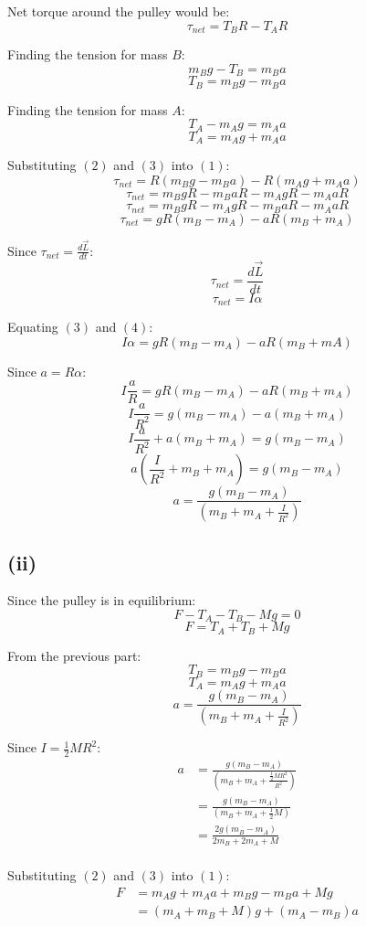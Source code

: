 \documentclass[11pt]{article}
\begin{document}
Net torque around the pulley would be:
\[\tau_{net} = T_B R - T_A R \tag{1}\]

Finding the tension for mass \(B\):
\[m_B g - T_B = m_B a\]
\[T_B = m_B g - m_B a \tag{2}\]

Finding the tension for mass \(A\):
\[T_A - m_A g = m_A a\]
\[T_A = m_A g + m_A a \tag{3}\]

Substituting \((2)\) and \((3)\) into \((1)\):
\[\tau_{net} = R(m_B g - m_B a) - R(m_A g + m_A a) \]
\[\tau_{net} = m_B gR - m_B aR - m_A gR - m_A aR \]
\[\tau_{net} = m_B gR - m_A gR - m_B aR - m_A aR \]
\[\tau_{net} = gR(m_B - m_A) - aR(m_B + m_A) \]

Since \(\tau_{net} = \frac{d \vec{L}}{dt}\):
\[\tau_{net} = \frac{d \vec{L}}{dt}\]
\[\tau_{net} = I \alpha \tag{4}\]

Equating \((3)\) and \((4)\):
\[I \alpha = gR(m_B - m_A) - aR(m_B + mA)\]

\newpage

Since \(a = R \alpha\):
\[I \frac{a}{R} = gR(m_B - m_A) - aR(m_B + m_A)\]
\[I \frac{a}{R^2} = g(m_B - m_A) - a(m_B + m_A)\]
\[I \frac{a}{R^2} + a (m_B + m_A) = g(m_B - m_A)\]
\[a \left(\frac{I}{R^2} + m_B + m_A \right) = g(m_B - m_A)\]
\[a = \frac{g(m_B - m_A)}{\left(m_B + m_A + \frac{I}{R^2} \right)}\]

\subsection{(ii)}
\label{sec:org2a51348}
Since the pulley is in equilibrium:
\[F - T_A - T_B - Mg = 0\]
\[F = T_A + T_B + Mg \tag{1}\]

From the previous part:
\[T_B = m_B g - m_B a \tag{2}\]
\[T_A = m_A g + m_A a \tag{3}\]
\[a = \frac{g(m_B - m_A)}{\left(m_B + m_A + \frac{I}{R^2} \right)}\]

Since \(I = \frac{1}{2}MR^2\):
\begin{align*}
a &= \frac{g(m_B - m_A)}{\left(m_B + m_A + \frac{\frac{1}{2} M R^2}{R^2} \right)} \\
&= \frac{g(m_B - m_A)}{\left(m_B + m_A + \frac{1}{2} M \right)} \\
&= \frac{2g(m_B - m_A)}{2m_B + 2m_A + M} \tag{4} \\
\end{align*}

Substituting \((2)\) and \((3)\) into \((1)\):
\begin{align*}
F &= m_A g + m_A a + m_B g - m_B a + Mg \\
&= (m_A + m_B + M)g + (m_A - m_B)a \tag{5}
\end{align*}
\end{document}
